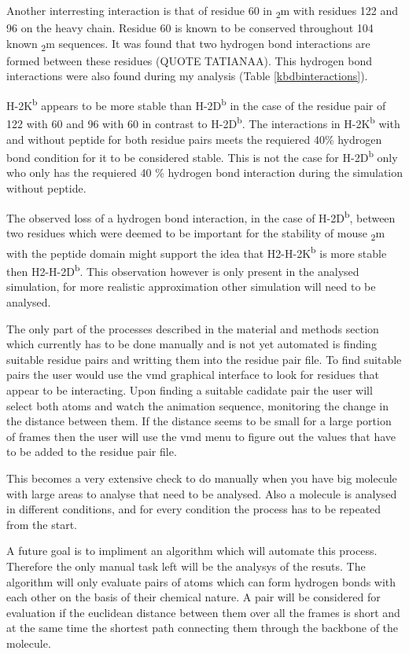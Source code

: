 \documentclass[11pt,twocolumn]{article}
\newcommand{\db}{H-2D\textsuperscript{b}\xspace}
\newcommand{\kb}{H-2K\textsuperscript{b}\xspace}
\newcommand{\btm}{\textbeta\textsubscript{2}m\xspace}
\begin{document}
Another interresting interaction is that of residue 60 in \btm with residues 122 and 96 on the heavy chain. Residue 60 is known to be conserved throughout 104 known \btm
sequences. It was found that two hydrogen bond interactions are formed between these residues (QUOTE TATIANAA). This hydrogen bond interactions were also found during my analysis (Table \ref{kbdbinteractions}). 

\kb appears to be more stable than \db in the case of the residue pair of 122 with 60 and 96 with 60 in contrast to \db . The  interactions in \kb with and without peptide for both residue pairs meets the requiered 40\% hydrogen bond condition for it to be considered stable. This is not the case for \db only who only has the requiered 40 \% hydrogen bond interaction during the simulation without peptide.


The observed loss of a hydrogen bond interaction, in the case of \db, between two residues which were deemed to be important for the stability of mouse \btm with the peptide domain might support the idea that H2-\kb is more stable then H2-\db. This observation however is only present in the analysed simulation, for more realistic approximation other simulation will need to be analysed.

The only part of the processes described in the material and methods section which currently has to be done manually and is not yet automated is finding suitable residue pairs and writting them into the residue pair file. To find suitable pairs the user would use the vmd graphical interface to look for residues that appear to be interacting. Upon finding a suitable cadidate pair the user will select both atoms and watch the animation sequence, monitoring the change in the distance between them. If the distance seems to be small for a large portion of frames then the user will use the vmd menu to figure out the values that have to be added to the residue pair file.

This becomes a very extensive check to do manually when you have big molecule with large areas to analyse that need to be analysed. Also a molecule is analysed in different conditions, and for every condition the process has to be repeated from the start. 

A future goal is to impliment an algorithm which will automate this process. Therefore the only manual task left will be the analysys of the resuts. The algorithm will only evaluate pairs of atoms which can form hydrogen bonds with each other on the basis of their chemical nature. A pair will be considered for evaluation if the euclidean distance between them over all the frames is short and at the same time the shortest path connecting them through the backbone of the molecule. 

\pagebreak



\end{document}
